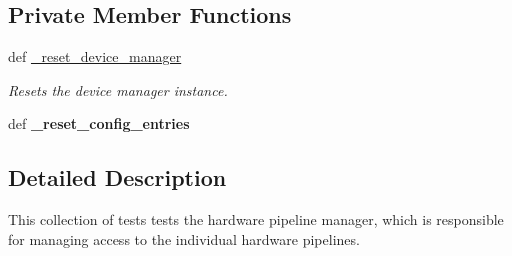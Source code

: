 \subsection*{Private Member Functions}
\begin{DoxyCompactItemize}
\item 
def \hyperlink{classhwm_1_1hardware_1_1pipelines_1_1tests_1_1test__pipeline__manager_1_1_test_pipeline_manager_a4c08b28c93be6c3debcd8aaddb2de5e2}{\-\_\-reset\-\_\-device\-\_\-manager}
\begin{DoxyCompactList}\small\item\em Resets the device manager instance. \end{DoxyCompactList}\item 
\hypertarget{classhwm_1_1hardware_1_1pipelines_1_1tests_1_1test__pipeline__manager_1_1_test_pipeline_manager_a78d66e796179f40f732ce7d1d76b76b5}{def {\bfseries \-\_\-reset\-\_\-config\-\_\-entries}}\label{classhwm_1_1hardware_1_1pipelines_1_1tests_1_1test__pipeline__manager_1_1_test_pipeline_manager_a78d66e796179f40f732ce7d1d76b76b5}

\end{DoxyCompactItemize}


\subsection{Detailed Description}
This collection of tests tests the hardware pipeline manager, which is responsible for managing access to the individual hardware pipelines. 

